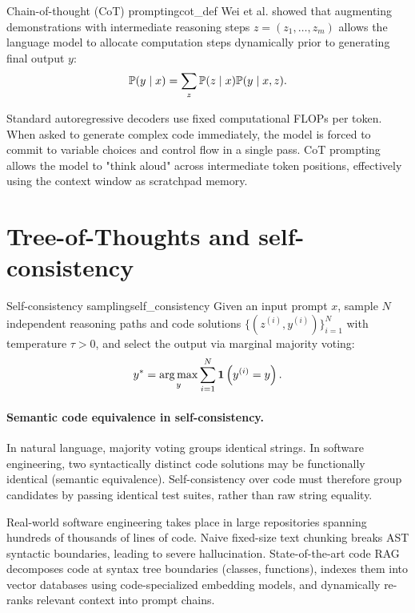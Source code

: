 \documentclass[../../main.tex]{subfiles}
\begin{document}
\begin{definition}{Chain-of-thought (CoT) prompting}{cot_def}
Wei et al. \citep{wei2022chain} showed that augmenting demonstrations with intermediate reasoning steps $z = (z_1, \dots, z_m)$ allows the language model to allocate computation steps dynamically prior to generating final output $y$:
\begin{equation}
\mathbb{P}(y \mid x) = \sum_{z} \mathbb{P}(z \mid x) \mathbb{P}(y \mid x, z).
\end{equation}
\end{definition}

\begin{intuition}
Standard autoregressive decoders use fixed computational FLOPs per token. When asked to generate complex code immediately, the model is forced to commit to variable choices and control flow in a single pass. CoT prompting allows the model to "think aloud" across intermediate token positions, effectively using the context window as scratchpad memory.
\end{intuition}

\section{Tree-of-Thoughts and self-consistency}
\begin{definition}{Self-consistency sampling}{self_consistency}
Given an input prompt $x$, sample $N$ independent reasoning paths and code solutions $\{ (z^{(i)}, y^{(i)}) \}_{i=1}^N$ with temperature $\tau > 0$, and select the output via marginal majority voting:
\begin{equation}
y^* = \operatorname*{\mathrm{arg\,max}}_{y} \sum_{i=1}^N \mathbf{1}\left( y^{(i)} = y \right).
\end{equation}
\end{definition}

\paragraph{Semantic code equivalence in self-consistency.}
In natural language, majority voting groups identical strings. In software engineering, two syntactically distinct code solutions may be functionally identical (semantic equivalence). Self-consistency over code must therefore group candidates by passing identical test suites, rather than raw string equality.


\begin{deepdive}
Real-world software engineering takes place in large repositories spanning hundreds of thousands of lines of code. Naive fixed-size text chunking breaks AST syntactic boundaries, leading to severe hallucination. State-of-the-art code RAG decomposes code at syntax tree boundaries (classes, functions), indexes them into vector databases using code-specialized embedding models, and dynamically re-ranks relevant context into prompt chains.
\end{deepdive}
\end{document}
